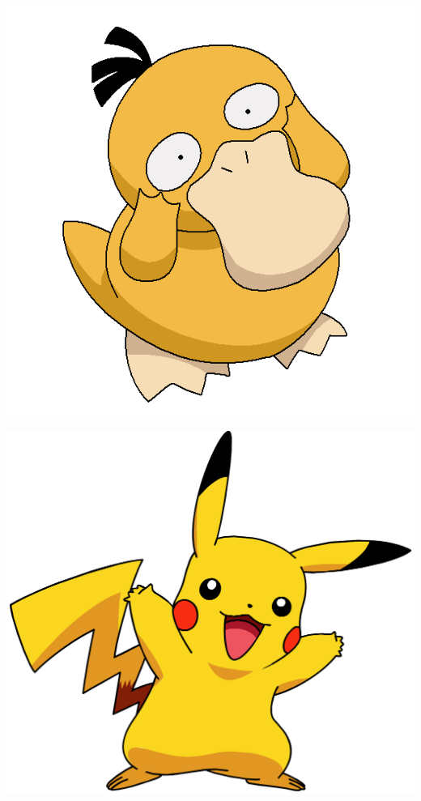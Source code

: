 \documentclass[a4paper,twoside, openany,11pt]{book}
\begin{document}
\begin{minipage}{0.45\textwidth}
\includegraphics[scale = 0.42]{Images/Psykokwak.png}
\end{minipage}
\begin{minipage}{0.45\textwidth}
\includegraphics[scale = 0.26]{Images/Pikachu.png}
\end{minipage}
\end{document}
